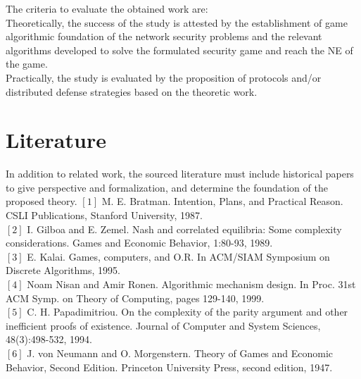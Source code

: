 \documentclass[10pt]{article}
\theoremstyle{definition}
\begin{document}
The criteria to evaluate the obtained work are:
\\ Theoretically, the success of the study is attested by the establishment of game algorithmic
foundation of the network security problems and the relevant algorithms developed to solve the
formulated security game and reach the NE of the game.
\\ Practically, the study is evaluated by the proposition of protocols and/or distributed defense
strategies based on the theoretic work.

\section{Literature}

In addition to related work, the sourced literature must include historical papers to give perspective and formalization, and determine the foundation of the proposed theory.
$[1]$ M. E. Bratman. Intention, Plans, and Practical Reason. CSLI Publications, Stanford University,
1987.\\
$[2]$ I. Gilboa and E. Zemel. Nash and correlated equilibria: Some complexity considerations. Games
and Economic Behavior, 1:80-93, 1989.\\
$[3]$ E. Kalai. Games, computers, and O.R. In ACM/SIAM Symposium on Discrete Algorithms, 1995.\\
$[4]$ Noam Nisan and Amir Ronen. Algorithmic mechanism design. In Proc. 31st ACM Symp. on
Theory of Computing, pages 129-140, 1999.\\
$[5]$ C. H. Papadimitriou. On the complexity of the parity argument and other inefficient proofs of
existence. Journal of Computer and System Sciences, 48(3):498-532, 1994.\\
$[6]$ J. von Neumann and O. Morgenstern. Theory of Games and Economic Behavior, Second Edition.
Princeton University Press, second edition, 1947.\\
\end{document}
